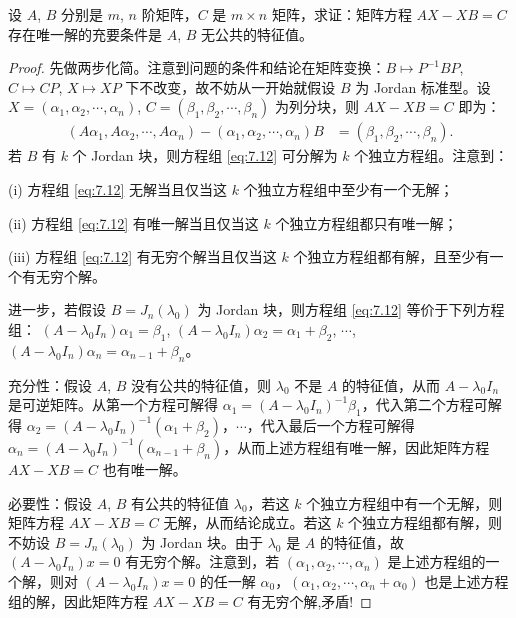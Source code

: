 \documentclass[../../main.tex]{subfiles}
\begin{document}
\begin{proposition}\label{proposition:AX-XB线性映射相关等价条件--(3)}
设 $A$, $B$ 分别是 $m$, $n$ 阶矩阵，$C$ 是 $m\times n$ 矩阵，求证：矩阵方程 $AX - XB = C$ 存在唯一解的充要条件是 $A$, $B$ 无公共的特征值。
\end{proposition}
\begin{proof}
先做两步化简。注意到问题的条件和结论在矩阵变换：$B\mapsto P^{-1}BP$, $C\mapsto CP$, $X\mapsto XP$ 下不改变，故不妨从一开始就假设 $B$ 为 Jordan 标准型。设 $X = (\alpha_1,\alpha_2,\cdots,\alpha_n)$, $C = (\beta_1,\beta_2,\cdots,\beta_n)$ 为列分块，则 $AX - XB = C$ 即为：
\begin{align}
(A\alpha_1,A\alpha_2,\cdots,A\alpha_n) - (\alpha_1,\alpha_2,\cdots,\alpha_n)B &= (\beta_1,\beta_2,\cdots,\beta_n).\label{eq:7.12}
\end{align}
若 $B$ 有 $k$ 个 Jordan 块，则方程组 \eqref{eq:7.12} 可分解为 $k$ 个独立方程组。注意到：

(i) 方程组 \eqref{eq:7.12} 无解当且仅当这 $k$ 个独立方程组中至少有一个无解；

(ii) 方程组 \eqref{eq:7.12} 有唯一解当且仅当这 $k$ 个独立方程组都只有唯一解；

(iii) 方程组 \eqref{eq:7.12} 有无穷个解当且仅当这 $k$ 个独立方程组都有解，且至少有一个有无穷个解。

进一步，若假设 $B = J_n(\lambda_0)$ 为 Jordan 块，则方程组 \eqref{eq:7.12} 等价于下列方程组：
$(A - \lambda_0I_n)\alpha_1 = \beta_1$, $(A - \lambda_0I_n)\alpha_2 = \alpha_1 + \beta_2$, $\cdots$, $(A - \lambda_0I_n)\alpha_n = \alpha_{n - 1} + \beta_n$。

{\heiti 充分性：}假设 $A$, $B$ 没有公共的特征值，则 $\lambda_0$ 不是 $A$ 的特征值，从而 $A - \lambda_0I_n$ 是可逆矩阵。从第一个方程可解得 $\alpha_1 = (A - \lambda_0I_n)^{-1}\beta_1$，代入第二个方程可解得 $\alpha_2 = (A - \lambda_0I_n)^{-1}(\alpha_1 + \beta_2)$，$\cdots$，代入最后一个方程可解得 $\alpha_n = (A - \lambda_0I_n)^{-1}(\alpha_{n - 1} + \beta_n)$，从而上述方程组有唯一解，因此矩阵方程 $AX - XB = C$ 也有唯一解。

{\heiti 必要性：}假设 $A$, $B$ 有公共的特征值 $\lambda_0$，若这 $k$ 个独立方程组中有一个无解，则矩阵方程 $AX - XB = C$ 无解，从而结论成立。若这 $k$ 个独立方程组都有解，则不妨设 $B = J_n(\lambda_0)$ 为 Jordan 块。由于 $\lambda_0$ 是 $A$ 的特征值，故 $(A - \lambda_0I_n)x = 0$ 有无穷个解。注意到，若 $(\alpha_1,\alpha_2,\cdots,\alpha_n)$ 是上述方程组的一个解，则对 $(A - \lambda_0I_n)x = 0$ 的任一解 $\alpha_0$，$(\alpha_1,\alpha_2,\cdots,\alpha_n + \alpha_0)$ 也是上述方程组的解，因此矩阵方程 $AX - XB = C$ 有无穷个解,矛盾!
\end{proof}
\end{document}
